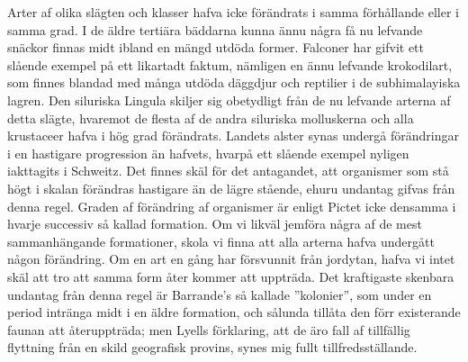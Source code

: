 Arter af olika slägten och klasser hafva icke förändrats i samma förhållande eller i samma grad. I de äldre tertiära bäddarna kunna ännu några få nu lefvande snäckor finnas midt ibland en mängd utdöda former. Falconer har gifvit ett slående exempel på ett likartadt faktum, nämligen en ännu lefvande krokodilart, som finnes blandad med många utdöda däggdjur och reptilier i de subhimalayiska lagren. Den siluriska Lingula skiljer sig obetydligt från de nu lefvande arterna af detta slägte, hvaremot de flesta af de andra siluriska molluskerna och alla krustaceer hafva i hög grad förändrats. Landets alster synas undergå förändringar i en hastigare progression än hafvets, hvarpå ett slående exempel nyligen iakttagits i Schweitz. Det finnes skäl för det antagandet, att organismer som stå högt i skalan förändras hastigare än de lägre stående, ehuru undantag gifvas från denna regel. Graden af förändring af organismer är enligt Pictet icke densamma i hvarje successiv så kallad formation. Om vi likväl jemföra några af de mest sammanhängande formationer, skola vi finna att alla arterna hafva undergått någon förändring. Om en art en gång har försvunnit från jordytan, hafva vi intet skäl att tro att samma form åter kommer att uppträda. Det kraftigaste skenbara undantag från denna regel är Barrande’s så kallade ”kolonier”, som under en period intränga midt i en äldre formation, och sålunda tillåta den förr existerande faunan att återuppträda; men Lyells förklaring, att de äro fall af tillfällig flyttning från en skild geografisk provins, synes mig fullt tillfredsställande.

